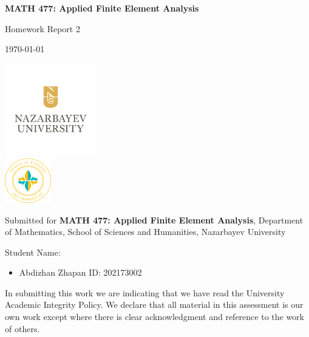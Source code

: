 \documentclass[12pt, a4paper]{article}
\begin{document}
\begin{titlepage}
    \centering

    \vspace*{0.5cm}
    {\Large\bfseries MATH 477: Applied Finite Element Analysis\par}

    \vspace{1cm}
    {\large Homework Report 2\par}

    \vspace{0.5cm}
    {\today\par}

    \vspace{1pt}
    \includegraphics[width=0.3\textwidth]{NU-logo.png}\\
    \includegraphics[width=0.15\textwidth]{sosah-logo.png}

    \vspace{0.5cm}
    Submitted for {\bf MATH 477: Applied Finite Element Analysis}, Department of Mathematics, School of Sciences and Humanities, Nazarbayev University

    \vspace{0.5cm}
    {\large Student Name:\par}
    \begin{itemize}[leftmargin=5cm,rightmargin=4cm]
        \item Abdizhan Zhapan \quad ID: 202173002
    \end{itemize}

    \vspace{0.5cm}

    \vspace{0.5cm}
    {\footnotesize In submitting this work we are indicating
    that we have read the University Academic Integrity Policy. We
    declare that all material in this assessment is our own work except
    where there is clear acknowledgment and reference to the work of
    others.\par}
\end{titlepage}
\end{document}
